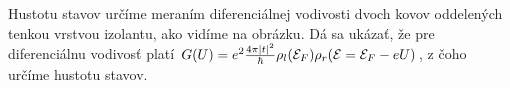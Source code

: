 \documentclass[
	11pt, %
]{beamer}
\begin{document}
\begin{frame}
\begin{figure}
    \vspace{-10mm}
    \label{fig:example}%
\end{figure}
\small
Hustotu stavov určíme meraním diferenciálnej vodivosti dvoch kovov oddelených tenkou vrstvou izolantu, ako vidíme na obrázku. 
Dá sa ukázať, že pre diferenciálnu vodivosť platí
$G(U)=e^2\frac{4\pi|t|^2}{\hbar}\rho_l(\mathcal{E}_F)\rho_r(\mathcal{E}=\mathcal{E}_F-eU)$, z čoho určíme hustotu stavov. 
\normalsize
\end{frame}
\end{document}
